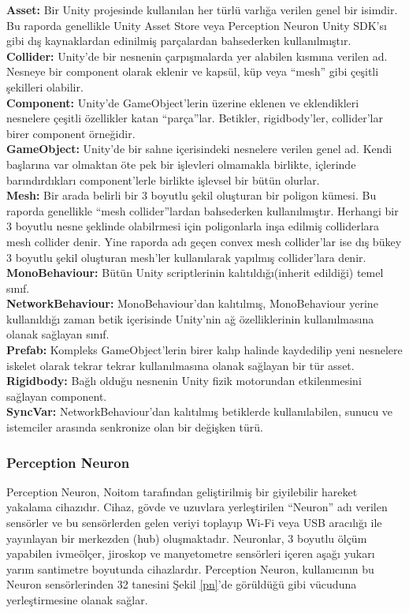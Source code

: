 \documentclass[a4paper, 12pt, titlepage]{article}
\begin{document}
\textbf{Asset:} Bir Unity projesinde kullanılan her türlü varlığa verilen genel bir isimdir.
\cite{asset} Bu raporda genellikle Unity Asset Store veya Perception Neuron Unity SDK’sı gibi dış
kaynaklardan edinilmiş parçalardan bahsederken kullanılmıştır. \\
\textbf{Collider:} Unity’de bir nesnenin çarpışmalarda yer alabilen kısmına verilen ad. Nesneye bir
component olarak eklenir ve kapsül, küp veya “mesh” gibi çeşitli şekilleri olabilir.
\cite{collider} \\
\textbf{Component:} Unity’de GameObject’lerin üzerine eklenen ve eklendikleri nesnelere çeşitli
özellikler katan “parça”lar. Betikler, rigidbody’ler, collider’lar birer component örneğidir.
\cite{component} \\
\textbf{GameObject:} Unity’de bir sahne içerisindeki nesnelere verilen genel ad. Kendi başlarına
var olmaktan öte pek bir işlevleri olmamakla birlikte, içlerinde barındırdıkları component’lerle
birlikte işlevsel bir bütün olurlar. \cite{gameobject} \\
\textbf{Mesh:} Bir arada belirli bir 3 boyutlu şekil oluşturan bir poligon kümesi. \cite{mesh} Bu
raporda genellikle “mesh collider”lardan bahsederken kullanılmıştır. Herhangi bir 3 boyutlu nesne
şeklinde olabilrmesi için poligonlarla inşa edilmiş colliderlara mesh collider denir. Yine raporda
adı geçen convex mesh collider’lar ise dış bükey 3 boyutlu şekil oluşturan mesh’ler kullanılarak
yapılmış collider’lara denir. \\
\textbf{MonoBehaviour:} Bütün Unity scriptlerinin kalıtıldığı(inherit edildiği) temel sınıf.
\cite{monob} \\
\textbf{NetworkBehaviour:} MonoBehaviour’dan kalıtılmış, MonoBehaviour yerine kullanıldığı zaman
betik içerisinde Unity’nin ağ özelliklerinin kullanılmasına olanak sağlayan sınıf. \\
\textbf{Prefab:} Kompleks GameObject’lerin birer kalıp halinde kaydedilip yeni nesnelere iskelet
olarak tekrar tekrar kullanılmasına olanak sağlayan bir tür asset. \cite{prefab} \\
\textbf{Rigidbody:} Bağlı olduğu nesnenin Unity fizik motorundan etkilenmesini sağlayan component.
\cite{rigidb} \\
\textbf{SyncVar:} NetworkBehaviour’dan kalıtılmış betiklerde kullanılabilen, sunucu ve istemciler
arasında senkronize olan bir değişken türü. \cite{syncv} \\

\subsubsection{Perception Neuron}
Perception Neuron, Noitom tarafından geliştirilmiş bir giyilebilir hareket yakalama cihazıdır.
Cihaz, gövde ve uzuvlara yerleştirilen “Neuron” adı verilen sensörler ve bu sensörlerden gelen
veriyi toplayıp Wi-Fi veya USB aracılığı ile yayınlayan bir merkezden (hub) oluşmaktadır.
\cite{mocap} Neuronlar, 3 boyutlu ölçüm yapabilen ivmeölçer, jiroskop ve manyetometre sensörleri
içeren aşağı yukarı yarım santimetre boyutunda cihazlardır. \cite{ebilgin} Perception Neuron,
kullanıcının bu Neuron sensörlerinden 32 tanesini Şekil \ref{pn}'de görüldüğü gibi vücuduna
yerleştirmesine olanak sağlar.
\end{document}
